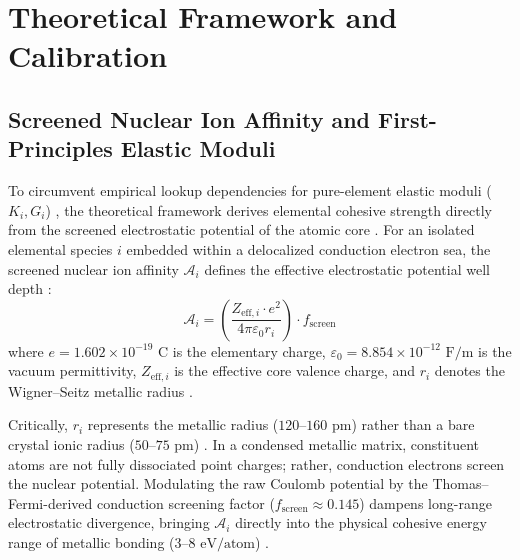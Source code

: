 \documentclass[aps,prmaterials,reprint,superscriptaddress,amsmath,amssymb,floatfix]{revtex4-2}
\begin{document}
\section{Theoretical Framework and Calibration}

\subsection{Screened Nuclear Ion Affinity and First-Principles Elastic Moduli}
To circumvent empirical lookup dependencies for pure-element elastic moduli ($K_i, G_i$) \cite{AshcroftMermin}, the theoretical framework derives elemental cohesive strength directly from the screened electrostatic potential of the atomic core \cite{Rose1984}. For an isolated elemental species $i$ embedded within a delocalized conduction electron sea, the screened nuclear ion affinity $\mathcal{A}_i$ defines the effective electrostatic potential well depth \cite{AshcroftMermin,Rose1984}:
\begin{equation}
\mathcal{A}_i = \left( \frac{Z_{\text{eff},i} \cdot e^2}{4\pi \varepsilon_0 r_i} \right) \cdot f_{\text{screen}}
\label{eq:affinity}
\end{equation}
where $e = 1.602 \times 10^{-19}\text{ C}$ is the elementary charge, $\varepsilon_0 = 8.854 \times 10^{-12}\text{ F/m}$ is the vacuum permittivity, $Z_{\text{eff},i}$ is the effective core valence charge, and $r_i$ denotes the Wigner--Seitz metallic radius \cite{AshcroftMermin,WignerSeitz1933,WignerSeitz1934}.

Critically, $r_i$ represents the metallic radius ($120\text{--}160\text{ pm}$) \cite{WignerSeitz1933,AshcroftMermin} rather than a bare crystal ionic radius ($50\text{--}75\text{ pm}$) \cite{Shannon1976}. In a condensed metallic matrix, constituent atoms are not fully dissociated point charges; rather, conduction electrons screen the nuclear potential. Modulating the raw Coulomb potential by the Thomas--Fermi-derived conduction screening factor ($f_{\text{screen}} \approx 0.145$) dampens long-range electrostatic divergence, bringing $\mathcal{A}_i$ directly into the physical cohesive energy range of metallic bonding ($3\text{--}8\text{ eV/atom}$) \cite{Rose1984,Kittel2005}.
\end{document}
